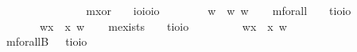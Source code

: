 \begin{isabellebody}
\ \ \ \ \ {\isachardoublequoteopen}{\isasymphi}{\isasymoplus}{\isasympsi}\ {\isasymequiv}\ \ {\isacharparenleft}{\isasymphi}{\isasymor}{\isasympsi}{\isacharparenright}\ {\isasymand}\ {\isasymnot}{\isacharparenleft}{\isasymphi}{\isasymand}{\isasympsi}{\isacharparenright}{\isachardoublequoteclose}\ \isanewline
\ \ \isamarkupfalse%
\ mxor\ \ \ {\isacharcolon}{\isacharcolon}\ {\isachardoublequoteopen}io{\isasymRightarrow}io{\isasymRightarrow}io{\isachardoublequoteclose}\ {\isacharparenleft}\isanewline
\ \ \ \ \ {\isachardoublequoteopen}{\isasymphi}\isactrlbold {\isasymoplus}{\isasympsi}\ {\isasymequiv}\ {\isasymlambda}w{\isachardot}\ {\isacharparenleft}{\isasymphi}\ w{\isacharparenright}{\isasymoplus}{\isacharparenleft}{\isasympsi}\ w{\isacharparenright}{\isachardoublequoteclose}%
\isamarkuptrue%
\ \ \isamarkupfalse%
\ mforall\ \ \ {\isacharcolon}{\isacharcolon}\ {\isachardoublequoteopen}{\isacharparenleft}{\isacharprime}t{\isasymRightarrow}io{\isacharparenright}{\isasymRightarrow}io{\isachardoublequoteclose}\ {\isacharparenleft}{\isachardoublequoteopen}\isactrlbold {\isasymforall}{\isachardoublequoteclose}{\isacharparenright}\ \ \ \ \ \ \isanewline
\ \ \ \ \ {\isachardoublequoteopen}\isactrlbold {\isasymforall}{\isasymPhi}\ {\isasymequiv}\ {\isasymlambda}w{\isachardot}{\isasymforall}x{\isachardot}\ {\isacharparenleft}{\isasymPhi}\ x\ w{\isacharparenright}{\isachardoublequoteclose}\isanewline
\ \ \isamarkupfalse%
\ mexists\ \ \ {\isacharcolon}{\isacharcolon}\ {\isachardoublequoteopen}{\isacharparenleft}{\isacharprime}t{\isasymRightarrow}io{\isacharparenright}{\isasymRightarrow}io{\isachardoublequoteclose}\ {\isacharparenleft}{\isachardoublequoteopen}\isactrlbold {\isasymexists}{\isachardoublequoteclose}{\isacharparenright}\ \isanewline
\ \ \ \ \ {\isachardoublequoteopen}\isactrlbold {\isasymexists}{\isasymPhi}\ {\isasymequiv}\ {\isasymlambda}w{\isachardot}{\isasymexists}x{\isachardot}\ {\isacharparenleft}{\isasymPhi}\ x\ w{\isacharparenright}{\isachardoublequoteclose}\isanewline
\ \ \ \ \ \ \isanewline
\ \ \isamarkupfalse%
\ mforallB\ \ {\isacharcolon}{\isacharcolon}\ {\isachardoublequoteopen}{\isacharparenleft}{\isacharprime}t{\isasymRightarrow}io{\isacharparenright}{\isasymRightarrow}io{\isachardoublequoteclose}\ {\isacharparenleft}\ %

\end{isabellebody}
